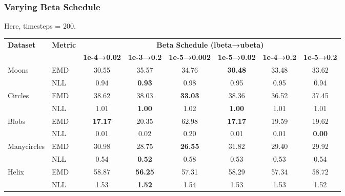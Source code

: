 \documentclass[11pt]{article}
\begin{document}
\subsubsection{Varying Beta Schedule}
Here, timesteps = 200.

\begin{longtable}{|l|l|c|c|c|c|c|c|}
    \hline
     \textbf{Dataset} & \textbf{Metric} & \multicolumn{6}{c|}{\textbf{Beta Schedule (lbeta→ubeta)}} \\
     \cline{3-8}
     & & \textbf{1e-4→0.02} & \textbf{1e-3→0.2} & \textbf{1e-5→0.002} & \textbf{1e-5→0.02} & \textbf{1e-4→0.2} & \textbf{1e-5→0.2} \\
    \hline
        \multirow{2}{*}{Moons} & EMD & 30.55 & 35.57 & 34.76 & \textbf{30.48} & 33.48 & 33.62 \\
        \cline{2-8}
        & NLL & 0.94 & \textbf{0.93} & 0.98 & 0.95 & 0.95 & 0.94 \\
        \hline
        \multirow{2}{*}{Circles} & EMD & 38.62 & 38.03 & \textbf{33.03} & 38.36 & 36.52 & 37.45 \\
        \cline{2-8}
        & NLL & 1.01 & \textbf{1.00} & 1.02 & \textbf{1.00} & 1.01 & 1.01 \\
        \hline
        \multirow{2}{*}{Blobs} & EMD & \textbf{17.17} & 20.35 & 62.98 & \textbf{17.17} & 19.59 & 19.62 \\
        \cline{2-8}
        & NLL & 0.01 & 0.02 & 0.20 & 0.01 & 0.01 & \textbf{0.00} \\
        \hline
        \multirow{2}{*}{Manycircles} & EMD & 30.98 & 28.75 & \textbf{26.55} & 31.82 & 29.40 & 29.92 \\
        \cline{2-8}
        & NLL & 0.54 & \textbf{0.52} & 0.58 & 0.53 & 0.53 & 0.54 \\
        \hline
        \multirow{2}{*}{Helix} & EMD & 58.87 & \textbf{56.25} & 57.31 & 58.29 & 57.34 & 58.72 \\
        \cline{2-8}
        & NLL & 1.53 & \textbf{1.52} & 1.54 & 1.53 & 1.53 & 1.52 \\
        \hline
\end{longtable}
\end{document}

